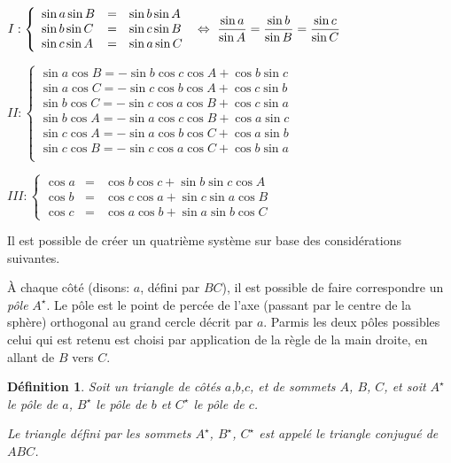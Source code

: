 \documentclass[12pt]{report}
\newtheorem{definition}{Définition}
\begin{document}
$I: \left\{ \begin{array}{lll} 
\sin a \sin B &=&   \sin b \sin A \\
\sin b \sin C &=&  \sin c \sin   B \\
\sin c \sin A &=& \sin a \sin C  \end{array} \right. \  \displaystyle \Leftrightarrow \ {\sin a \over \sin A} = {\sin b \over \sin B} = {\sin c \over \sin C}
$

\bigskip

$II: \left\{ \begin{array}{lll} 



\sin a \cos B = -\sin b \cos c \cos A + \cos b \sin c \\
\sin a \cos C = -\sin c \cos b \cos A + \cos c \sin b \\

\sin b \cos C = -\sin c \cos a \cos B + \cos c \sin a \\
\sin b \cos A = -\sin a \cos c \cos B + \cos a \sin c \\

\sin c \cos A = -\sin a \cos b \cos C + \cos a \sin b \\
\sin c \cos B = -\sin c \cos a \cos C + \cos b \sin a \\

\end{array} \right.
$

\bigskip

$III: \left\{ \begin{array}{lll} 
\cos a &=& \cos b \cos c + \sin b \sin c \cos A \\
\cos b &=& \cos c \cos a + \sin c \sin a \cos B \\
\cos c &=& \cos a \cos b + \sin a \sin b \cos C  \end{array} \right.
$

\bigskip
Il est possible de créer un quatrième système sur base des considérations suivantes. 

À chaque côté (disons: $a$, défini par $BC$), il est possible de faire correspondre un \emph{pôle} $A^\star$. Le pôle est le point de percée de l'axe (passant par le centre de la sphère) orthogonal au grand cercle décrit par $a$. Parmis les deux pôles possibles celui qui est retenu est choisi par application de la règle de la main droite, en allant de $B$ vers $C$. 

\begin{definition}
Soit un triangle de côtés $a$,$b$,$c$, et de sommets $A$, $B$, $C$, et soit 
$A^\star$ le pôle de $a$, 
$B^\star$ le pôle de $b$ et
$C^\star$ le pôle de $c$.

Le triangle défini par les sommets $A^\star$, $B^\star$, $C^\star$ est appelé le triangle conjugué de $ABC$.
\end{definition}
\end{document}
